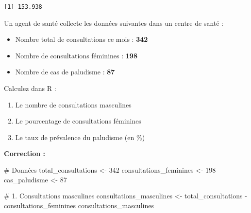 \documentclass[
  french,
  11pt,
  a4paper,
]{article}
\newenvironment{Shaded}{}{}
\newcommand{\CommentTok}[1]{\textcolor[rgb]{0.42,0.45,0.49}{#1}}
\newcommand{\DecValTok}[1]{\textcolor[rgb]{0.00,0.36,0.77}{#1}}
\newcommand{\NormalTok}[1]{\textcolor[rgb]{0.14,0.16,0.18}{#1}}
\newcommand{\OtherTok}[1]{\textcolor[rgb]{0.44,0.26,0.76}{#1}}
\newcommand{\SpecialCharTok}[1]{\textcolor[rgb]{0.00,0.36,0.77}{#1}}
\providecommand{\tightlist}{%
  \setlength{\itemsep}{0pt}\setlength{\parskip}{0pt}}
\begin{document}
\begin{verbatim}
[1] 153.938
\end{verbatim}

\begin{tcolorbox}[enhanced jigsaw, arc=.35mm, bottomrule=.15mm, bottomtitle=1mm, breakable, colback=white, colbacktitle=quarto-callout-caution-color!10!white, colframe=quarto-callout-caution-color-frame, coltitle=black, left=2mm, leftrule=.75mm, opacityback=0, opacitybacktitle=0.6, rightrule=.15mm, title=\textcolor{quarto-callout-caution-color}{\faFire}\hspace{0.5em}{Exercice 2 --- Application pratique}, titlerule=0mm, toprule=.15mm, toptitle=1mm]

Un agent de santé collecte les données suivantes dans un centre de santé
:

\begin{itemize}
\tightlist
\item
  Nombre total de consultations ce mois : \textbf{342}
\item
  Nombre de consultations féminines : \textbf{198}
\item
  Nombre de cas de paludisme : \textbf{87}
\end{itemize}

Calculez dans R :

\begin{enumerate}
\def\labelenumi{\arabic{enumi}.}
\tightlist
\item
  Le nombre de consultations masculines
\item
  Le pourcentage de consultations féminines
\item
  Le taux de prévalence du paludisme (en \%)
\end{enumerate}

\end{tcolorbox}

\textbf{Correction :}

\begin{Shaded}
\begin{Highlighting}[]
\CommentTok{\# Données}
\NormalTok{total\_consultations }\OtherTok{\textless{}{-}} \DecValTok{342}
\NormalTok{consultations\_feminines }\OtherTok{\textless{}{-}} \DecValTok{198}
\NormalTok{cas\_paludisme }\OtherTok{\textless{}{-}} \DecValTok{87}

\CommentTok{\# 1. Consultations masculines}
\NormalTok{consultations\_masculines }\OtherTok{\textless{}{-}}\NormalTok{ total\_consultations }\SpecialCharTok{{-}}\NormalTok{ consultations\_feminines}
\NormalTok{consultations\_masculines}
\end{Highlighting}
\end{Shaded}
\end{document}
